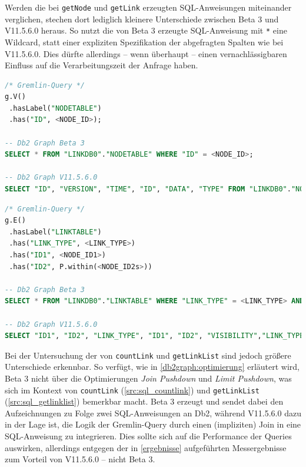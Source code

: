 Werden die bei \texttt{getNode} und \texttt{getLink} erzeugten SQL-Anweisungen miteinander verglichen,  stechen dort lediglich kleinere Unterschiede zwischen Beta 3 und V11.5.6.0 heraus. So nutzt die von Beta 3 erzeugte SQL-Anweisung mit \texttt{*} eine Wildcard, statt einer expliziten Spezifikation der abgefragten Spalten wie bei V11.5.6.0. Dies dürfte allerdings -- wenn überhaupt -- einen vernachlässigbaren Einfluss auf die Verarbeitungszeit der Anfrage haben.

\begin{lstlisting}[caption={Generierter SQL-Code getNode},label=src:sql_getnode,language=SQL]
/* Gremlin-Query */
g.V()
 .hasLabel("NODETABLE")
 .has("ID", <NODE_ID>);

-- Db2 Graph Beta 3
SELECT * FROM "LINKDB0"."NODETABLE" WHERE "ID" = <NODE_ID>;

-- Db2 Graph V11.5.6.0
SELECT "ID", "VERSION", "TIME", "ID", "DATA", "TYPE" FROM "LINKDB0"."NODETABLE" WHERE "ID" = <NODE_ID>;
\end{lstlisting}

\begin{lstlisting}[caption={Generierter SQL-Code getLink},label=src:sql_getlink,language=SQL]
/* Gremlin-Query */
g.E()
 .hasLabel("LINKTABLE")
 .has("LINK_TYPE", <LINK_TYPE>)
 .has("ID1", <NODE_ID1>)
 .has("ID2", P.within(<NODE_ID2s>))

-- Db2 Graph Beta 3
SELECT * FROM "LINKDB0"."LINKTABLE" WHERE "LINK_TYPE" = <LINK_TYPE> AND "ID1" = <NODE_ID1> AND "ID2" IN (VALUES <NODE_ID2_0>, <NODE_ID2_1>, <...>);

-- Db2 Graph V11.5.6.0
SELECT "ID1", "ID2", "LINK_TYPE", "ID1", "ID2", "VISIBILITY","LINK_TYPE", "DATA", "ID2", "ID1", "VERSION", "TIME" FROM "LINKDB0"."LINKTABLE" WHERE "LINK_TYPE" = <LINK_TYPE> AND "ID1" = <NODE_ID1> AND "ID2" IN (VALUES <NODE_ID2_0>, <NODE_ID2_1>, <...>);
\end{lstlisting}

Bei der Untersuchung der von \texttt{countLink} und \texttt{getLinkList} sind jedoch größere Unterschiede erkennbar. So verfügt, wie in \autoref{db2graph:optimierung} erläutert wird, Beta 3 nicht über die Optimierungen \textit{Join Pushdown} und \textit{Limit Pushdown}, was sich im Kontext von \texttt{countLink} (\autoref{src:sql_countlink}) und \texttt{getLinkList} (\autoref{src:sql_getlinklist}) bemerkbar macht. Beta 3 erzeugt und sendet dabei den Aufzeichnungen zu Folge zwei SQL-Anweisungen an Db2, während V11.5.6.0 dazu in der Lage ist, die Logik der Gremlin-Query durch einen (impliziten) Join in eine SQL-Anweisung zu integrieren. Dies sollte sich auf die Performance der Queries auswirken, allerdings entgegen der in \autoref{ergebnisse} aufgeführten Messergebnisse zum Vorteil von V11.5.6.0 -- nicht Beta 3. 

